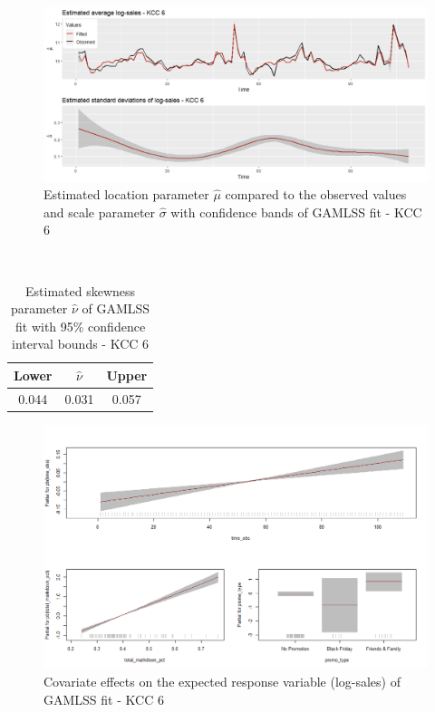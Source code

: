\begin{figure}[H]
\centering
  \includegraphics[width=0.95\linewidth]{figures/gamlss_kcc_6_estimated_parameters.png}
  \caption{Estimated location parameter $\hat{\mu}$ compared to the observed values and scale parameter $\hat{\sigma}$ with confidence bands of GAMLSS fit - KCC 6}
  \label{fig:gamlss_kcc_6_estimated_parameters}
\end{figure}



\begin{table}[H]
\setlength\arrayrulewidth{1pt}  
\centering
\begin{adjustbox}{max width=\textwidth}\
\begin{tabular}{c|c|c}
\hline
\rowcolor{white} 
\textbf{Lower} & $\hat{\nu}$ & \textbf{Upper} \\ \hline\hline
0.044        & 0.031           & 0.057        \\ \hline
\end{tabular}
\end{adjustbox}
\caption{Estimated skewness parameter $\hat{\nu}$ of GAMLSS fit with 95\% confidence interval bounds - KCC 6}
\label{tab:nu_ci_kcc_6}
\end{table}







\begin{figure}[H]
\centering
  \includegraphics[width=0.95\linewidth]{figures/gamlss_effects_kcc_6.png}
  \caption{Covariate effects on the expected response variable (log-sales) of GAMLSS fit - KCC 6}
  \label{fig:gamlss_effects_kcc_6}
\end{figure}



